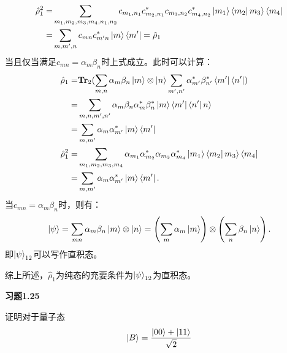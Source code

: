 \documentclass[reqno,a4paper,12pt]{amsart}
\begin{document}
\begin{tcolorbox}[breakable, colback = black!5!white, colframe = black]
\begin{align*}
	\hat{\rho}_1^2 =& \sum_{m_1,m_2,m_3,m_4,n_1,n_2} c_{m_1,n_1}c_{m_2,n_1}^* c_{m_3,n_2} c_{m_4,n_2}^* \ket{m_1} \bra{m_2} m_3 \rangle \bra{m_4} \\
	=& \sum_{m,m',n} c_{mn} c_{m'n}^* \ket{m} \bra{m'} = \hat{\rho}_1
\end{align*}
当且仅当满足$c_{mn} = \alpha_m \beta_n$时上式成立。此时可以计算：
\begin{align*}
	\hat{\rho}_1 =& \mathbf{Tr}_2 (\sum_{m,n} \alpha_m\beta_n \ket{m}\otimes \ket{n} \sum_{m',n'} \alpha_{m'}^*\beta_{n'}^* \bra{m'} \bra{n'}) \\
	=& \sum_{m,n,m',n'} \alpha_m\beta_n \alpha_m^*\beta_n^* \ket{m} \bra{m'} \bra{n'} n \rangle \\
	=& \sum_{m,m'} \alpha_m \alpha_{m'}^* \ket{m} \bra{m'} \\
	\hat{\rho}_1^2 =& \sum_{m_1,m_2,m_3,m_4} \alpha_{m_1}\alpha_{m_2}^* \alpha_{m_3} \alpha_{m_4}^* \ket{m_1} \bra{m_2} m_3 \rangle \bra{m_4} \\
	=& \sum_{m,m'} \alpha_m \alpha_{m'}^* \ket{m} \bra{m'}.
\end{align*}
当$c_{mn} = \alpha_m\beta_n$时，则有：
\[
	\ket{\psi} = \sum_{mn} \alpha_m \beta_n \ket{m} \otimes \ket{n} = \left( \sum_m \alpha_m \ket{m} \right) \otimes \left( \sum_{n} \beta_n \ket{n} \right).
\]
即$\ket{\psi}_{12}$可以写作直积态。

综上所述，$\hat{\rho}_1$为纯态的充要条件为$\ket{\psi}_{12}$为直积态。
\end{tcolorbox}

\textbf{习题1.25}

证明对于量子态
\[
	\ket{B} = \frac{\ket{00}+\ket{11}}{\sqrt{2}}
\]
\end{document}
